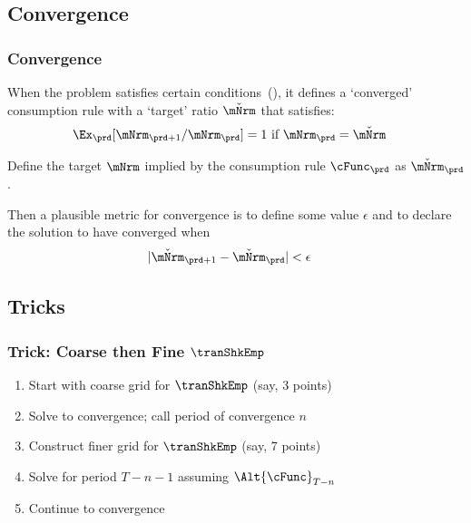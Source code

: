 \documentclass{beamer}
\begin{document}
\subsection{Convergence}
\begin{frame}
\frametitle{Convergence}

When the problem satisfies certain conditions~(\cite{BufferStockTheory}),
it defines a `converged' consumption rule with a `target' ratio $\check{\mNrm}$
that satisfies:
\begin{equation}\begin{gathered}\begin{aligned}
  \Ex_{\prd}[\mNrm_{\prd+1}/\mNrm_{\prd}]  & = 1 \text{~if $\mNrm_{\prd} = \check{\mNrm}$}
\end{aligned}\end{gathered}\end{equation}

\pause 

Define the target $\mNrm$ implied by the consumption rule $\cFunc_{\prd}$ as $\check{\mNrm}_{\prd}$.

\medskip\pause
Then a plausible metric for convergence is to define some value $\epsilon$ and to declare
the solution to have converged when
\begin{equation}\begin{gathered}\begin{aligned}
  |\check{\mNrm}_{\prd+1}-\check{\mNrm}_{\prd}|  & < \epsilon
\end{aligned}\end{gathered}\end{equation}

\end{frame}

\subsection{Tricks}
\begin{frame}
\frametitle{Trick: Coarse then Fine $\tranShkEmp$}

\begin{enumerate}
\item Start with coarse grid for $\tranShkEmp$ (say, 3 points)
\item Solve to convergence; call period of convergence $n$
\item Construct finer grid for $\tranShkEmp$ (say, 7 points)
\item Solve for period $T-n-1$ assuming $\Alt{\cFunc}_{T-n}$ 
\item Continue to convergence
\end{enumerate}

\end{frame}
\end{document}
